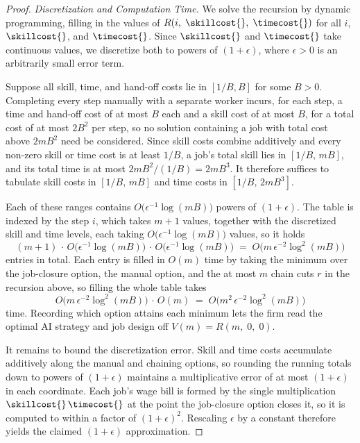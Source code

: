\begin{proof}
\emph{Discretization and Computation Time.}
We solve the recursion by dynamic programming, filling in the values of $R(i,\; \skillcost{},\; \timecost{})$ for all $i$, $\skillcost{}$, and $\timecost{}$.
Since $\skillcost{}$ and $\timecost{}$ take continuous values, we discretize both to powers of $(1+\epsilon)$, where $\epsilon > 0$ is an arbitrarily small error term.

Suppose all skill, time, and hand-off costs lie in $[1/B, B]$ for some $B > 0$.
Completing every step manually with a separate worker incurs, for each step, a time and hand-off cost of at most $B$ each and a skill cost of at most $B$, for a total cost of at most $2B^2$ per step, so no solution containing a job with total cost above $2mB^2$ need be considered.
Since skill costs combine additively and every non-zero skill or time cost is at least $1/B$, a job's total skill lies in $[1/B,\, mB]$, and its total time is at most $2mB^2/(1/B) = 2mB^3$.
It therefore suffices to tabulate skill costs in $[1/B,\, mB]$ and time costs in $[1/B,\, 2mB^3]$.

Each of these ranges contains $O\bigl(\epsilon^{-1}\log(mB)\bigr)$ powers of $(1+\epsilon)$.
The table is indexed by the step $i$, which takes $m+1$ values, together with the discretized skill and time levels, each taking $O\bigl(\epsilon^{-1}\log(mB)\bigr)$ values, so it holds
\[
(m+1)\,\cdot\,O\bigl(\epsilon^{-1}\log(mB)\bigr)\,\cdot\,O\bigl(\epsilon^{-1}\log(mB)\bigr) \;=\; O\bigl(m\,\epsilon^{-2}\log^2(mB)\bigr)
\]
entries in total.
Each entry is filled in $O(m)$ time by taking the minimum over the job-closure option, the manual option, and the at most $m$ chain cuts $r$ in the recursion above, so filling the whole table takes
\[
O\bigl(m\,\epsilon^{-2}\log^2(mB)\bigr)\,\cdot\,O(m) \;=\; O\bigl(m^2\,\epsilon^{-2}\log^2(mB)\bigr)
\]
time.
Recording which option attains each minimum lets the firm read the optimal AI strategy and job design off $V(m) = R(m,\; 0,\; 0)$.

It remains to bound the discretization error.
Skill and time costs accumulate additively along the manual and chaining options, so rounding the running totals down to powers of $(1+\epsilon)$ maintains a multiplicative error of at most $(1+\epsilon)$ in each coordinate.
Each job's wage bill is formed by the single multiplication $\skillcost{}\,\timecost{}$ at the point the job-closure option closes it, so it is computed to within a factor of $(1+\epsilon)^2$.
Rescaling $\epsilon$ by a constant therefore yields the claimed $(1+\epsilon)$ approximation.
\end{proof}
